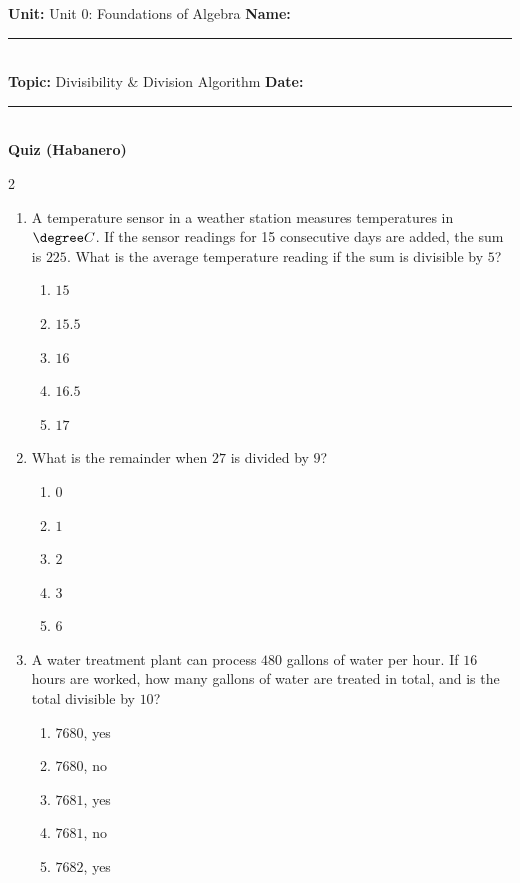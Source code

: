 \documentclass[10pt]{article}
\begin{document}
\enlargethispage{2.5cm}

\begin{tcolorbox}[colback=mainblue!5, colframe=mainblue, sharp corners, boxrule=0.5pt]
    \small \textbf{Unit:} Unit 0: Foundations of Algebra \hfill \textbf{Name:} \rule{3cm}{0.4pt} \\
    \small \textbf{Topic:} Divisibility & Division Algorithm \hfill \textbf{Date:} \rule{2cm}{0.4pt} \\
    \centering \textbf{\large Quiz (Habanero)}
\end{tcolorbox}

\vspace{0.2cm}

\begin{multicols}{2}
\begin{enumerate}[label=\textbf{Q\arabic*.}, leftmargin=*, itemsep=6pt, parsep=0pt]

  \item \small A temperature sensor in a weather station measures temperatures in $\degree C$. If the sensor readings for 15 consecutive days are added, the sum is $225$. What is the average temperature reading if the sum is divisible by $5$?
  \begin{enumerate}[label=(\Alph*), leftmargin=0.6cm, nosep, itemsep=2pt]
    \item $15$
    \item $15.5$
    \item $16$
    \item $16.5$
    \item $17$
  \end{enumerate}

  \item \small What is the remainder when $27$ is divided by $9$?
  \begin{enumerate}[label=(\Alph*), leftmargin=0.6cm, nosep, itemsep=2pt]
    \item $0$
    \item $1$
    \item $2$
    \item $3$
    \item $6$
  \end{enumerate}

  \item \small A water treatment plant can process $480$ gallons of water per hour. If $16$ hours are worked, how many gallons of water are treated in total, and is the total divisible by $10$?
  \begin{enumerate}[label=(\Alph*), leftmargin=0.6cm, nosep, itemsep=2pt]
    \item $7680$, yes
    \item $7680$, no
    \item $7681$, yes
    \item $7681$, no
    \item $7682$, yes
  \end{enumerate}


\end{enumerate}
\end{multicols}
\end{document}
